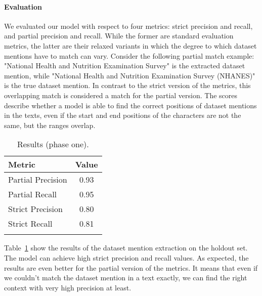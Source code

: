 \paragraph{Evaluation}
We evaluated our model with respect to four metrics: strict precision and recall, and partial precision and recall.
While the former are standard evaluation metrics, the latter are their relaxed variants in which the degree to which dataset mentions have to match can vary. 
Consider the following partial match example: "National Health and Nutrition Examination Survey" is the extracted dataset mention, while "National Health and Nutrition Examination Survey (NHANES)" is the true dataset mention. 
In contrast to the strict version of the metrics, this overlapping match is considered a match for the partial version.
The scores describe whether a model is able to find the correct positions of dataset mentions in the texts, even if the start and end positions of the characters are not the same, but the ranges overlap.
\begin{table}[b]
    \center 
    \caption{Results (phase one). } 
    \begin{tabular}{lc} 
        \toprule
        Metric  & Value \\
        \midrule
        Partial Precision   & 0.93 \\
        Partial Recall      & 0.95 \\
        \midrule
        Strict Precision    & 0.80 \\
        Strict Recall       & 0.81 \\ 
        \bottomrule \\ 
    \end{tabular} 
    \label{table:dataset-mention-eval} 
\end{table}

Table~\ref{table:dataset-mention-eval} show the results of the dataset mention extraction on the holdout set. The model can achieve high strict precision and recall values. As expected, the results are even better for the partial version of the metrics. It means that even if we couldn't match the dataset mention in a text exactly, we can find the right context with very high precision at least.


